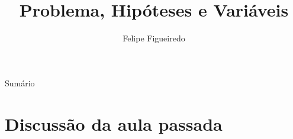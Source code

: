 \documentclass{beamer}
\title%
{Problema, Hipóteses e Variáveis}
\subtitle
{} %
\author%
{Felipe Figueiredo}%
\institute[INTO] %
{Instituto Nacional de Traumatologia e Ortopedia
}
\date%
{}
\begin{document}
\begin{frame}
  \titlepage
\end{frame}

\begin{frame}{Sumário}
  \tableofcontents
\end{frame}








\section{Discussão da aula passada}
\end{document}
